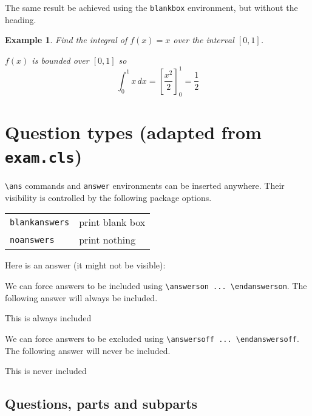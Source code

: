 \documentclass{article}
\theoremstyle{break}
\newcounter{theorem}
\newtheorem{example}[theorem]{Example}
\begin{document}
The same result be achieved using the {\tt blankbox} environment, but without the heading.
\begin{example}
Find the integral of $f(x)=x$ over the interval $[0,1]$.
\begin{blankbox}
$f(x)$ is bounded over $[0,1]$ so 
\[
\int_0^1 x\,dx = \left[\frac{x^2}{2}\right]_0^1 = \frac{1}{2}
\]
\end{blankbox}
\end{example}



\section{Question types (adapted from \texttt{exam.cls})}

\verb+\ans+ commands and {\tt answer} environments can be inserted anywhere. Their visibility is controlled by the following package options.

\bigskip
\begin{tabular}{ll}
\hline
{\tt blankanswers}	& print blank box \\
{\tt noanswers}		& print nothing \\
\hline
\end{tabular}
\bigskip

Here is an answer (it might not be visible):
\begin{answer}
\lipsum[1]
\end{answer}

We can force answers to be included using \verb+\answerson ... \endanswerson+. The following answer will always be included.
\answerson
\begin{answer}
This is always included
\end{answer}
\endanswerson

We can force answers to be excluded using  \verb+\answersoff ... \endanswersoff+. The following answer will never be included.
\answersoff
\begin{answer}
This is never included
\end{answer}
\endanswersoff

\subsection{Questions, parts and subparts}
\end{document}
